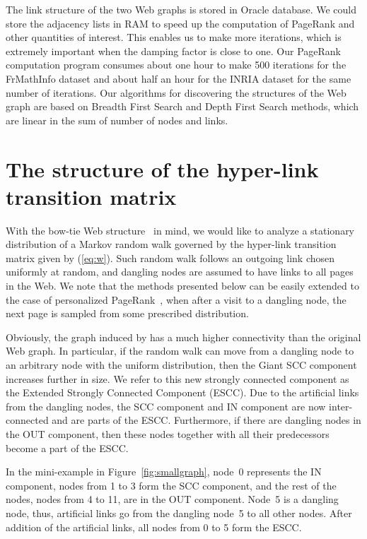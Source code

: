\documentclass{article}
\begin{document}
The link structure of the two Web graphs is stored in Oracle
database. We could store the adjacency lists in RAM to speed up the
computation of PageRank and other quantities of interest. This
enables us to make more iterations, which is extremely important
when the damping factor  is close to one. Our PageRank
computation program consumes about one hour to make 500 iterations
for the FrMathInfo dataset and about half an hour for the INRIA
dataset for the same number of iterations. Our algorithms for
discovering the structures of the Web graph are based on Breadth
First Search and Depth First Search methods, which are linear in the
sum of number of nodes and links.


\section{The structure of the hyper-link transition matrix}
\label{sec:ergodic}

With the bow-tie Web structure~\cite{Broder00,Kumar00} in mind, we
would like to analyze a stationary distribution of a Markov random
walk governed by the hyper-link transition matrix  given by
(\ref{eq:w}). Such random walk follows an outgoing link chosen
uniformly at random, and dangling nodes are assumed to have links to
all pages in the Web. We note that the methods presented below can
be easily extended to the case of personalized
PageRank~\cite{Haveliwala03}, when after a visit to a dangling node,
the next page is sampled from some prescribed distribution.

Obviously, the graph induced by  has a much higher connectivity
than the original Web graph. In particular, if the random walk can
move from a dangling node to an arbitrary node with the uniform
distribution, then the Giant SCC component increases further in
size. We refer to this new strongly connected component as the
Extended Strongly Connected Component (ESCC). Due to the artificial
links from the dangling nodes, the SCC component and IN component
are now inter-connected and are parts of the ESCC. Furthermore, if
there are dangling nodes in the OUT component, then these nodes
together with all their predecessors become a part of the ESCC.

In the mini-example in Figure~\ref{fig:smallgraph},
node~0 represents the IN component, nodes from 1 to 3 form the SCC
component, and the rest of the nodes, nodes from 4 to 11, are in
the OUT component. Node~5 is a dangling node, thus, artificial
links go from the dangling node~5 to all other nodes. After
addition of the artificial links, all nodes from 0 to 5 form the ESCC.
\end{document}
